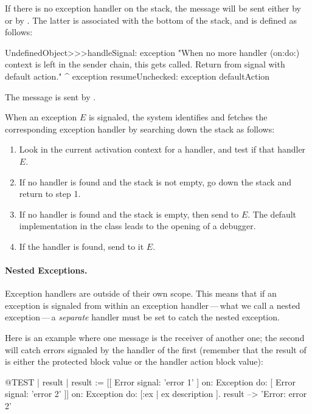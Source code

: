If there is no exception handler on the stack, the message  will be sent either by  or by . The latter is associated with the bottom of the stack, and is defined as follows:

\begin{code}{}
UndefinedObject>>>handleSignal: exception
	"When no more handler (on:do:) context is left in the sender chain, this gets called.  Return from signal with default action."
	^ exception resumeUnchecked: exception defaultAction
\end{code}

The message  is sent by . 

When an exception $E$ is signaled, the system identifies and fetches the corresponding exception handler by searching down the stack as follows:

\begin{enumerate}

\item Look in the current activation context for a handler, and test if that handler  $E$.

\item If no handler is found and the stack is not empty, go down the stack and return to step 1.

\item If no handler is found and the stack is empty, then send  to $E$. The default implementation in the  class leads to the opening of a debugger.

\item If the handler is found, send to it  $E$.

\end{enumerate}

\paragraph{Nested Exceptions.}
Exception handlers are outside of their own scope.  This means that if an exception is signaled from within an exception handler\,---\,what we call a nested exception\,---\,a \emph{separate} handler must be set to catch the nested exception.

Here is an example where one  message is the receiver of another one; the second will catch errors signaled by the handler of the first (remember that the result of  is either the protected block value or the handler action block value):
\begin{code}{@TEST | result |}
result := [[ Error signal: 'error 1' ]
	on: Exception
	do: [ Error signal: 'error 2' ]]
		on: Exception
		do: [:ex | ex description ].
result --> 'Error: error 2'
\end{code}

